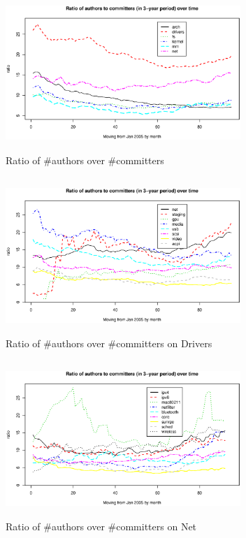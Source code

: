\documentclass{sig-alternate-05-2015}
\begin{document}
\begin{figure}
\centering
\includegraphics[height=2.33in, width=3.5in]{author2committer2.eps}
\caption{Ratio of \#authors over \#committers}
\label{fig:atr2cmtr}
\end{figure}

\begin{figure}
\centering
\includegraphics[height=2.33in, width=3.5in]{atr2cmtrDRIVERS.eps}
\caption{Ratio of \#authors over \#committers on Drivers}
\label{fig:ratiodrivers}
\end{figure}

\begin{figure}
\centering
\includegraphics[height=2.33in, width=3.5in]{atr2cmtrNET.eps}
\caption{Ratio of \#authors over \#committers on Net}
\label{fig:rationet}
\end{figure}
\end{document}
